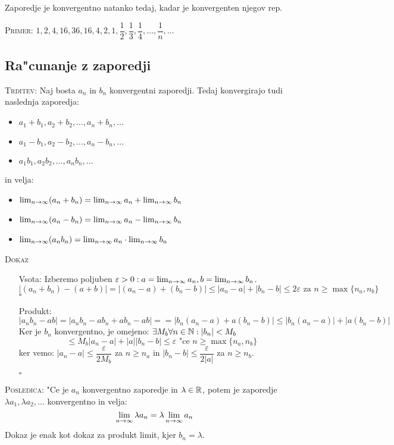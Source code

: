 Zaporedje je konvergentno natanko tedaj, kadar je konvergenten njegov rep.

\textsc{Primer:} $1, 2, 4, 16, 36, 16, 4, 2, 1, \dfrac{1}{2}, \dfrac{1}{3}, \dfrac{1}{4}, \ldots, \dfrac{1}{n}, \ldots$

\subsection{Ra"cunanje z zaporedji}
\textsc{Trditev:} Naj bosta $a_n$ in $b_n$ konvergentni zaporedji. Tedaj konvergirajo tudi naslednja zaporedja:
\begin{itemize}
	\item $a_1 + b_1, a_2 + b_2, \ldots, a_n + b_n, \ldots$
	\item $a_1 - b_1, a_2 - b_2, \ldots, a_n - b_n, \ldots$
	\item $a_1 b_1, a_2 b_2, \ldots, a_n b_n, \ldots$
\end{itemize}
in velja:
\begin{itemize}
	\item $\lim_{n \rightarrow \infty} (a_n + b_n) = \lim_{n \rightarrow \infty} a_n + \lim_{n \rightarrow \infty} b_n$
	\item $\lim_{n \rightarrow \infty} (a_n - b_n) = \lim_{n \rightarrow \infty} a_n - \lim_{n \rightarrow \infty} b_n$
	\item $\lim_{n \rightarrow \infty} (a_n b_n) = \lim_{n \rightarrow \infty} a_n \cdot \lim_{n \rightarrow \infty} b_n$
\end{itemize}
\textsc{Dokaz}
\begin{itemize}
	\item[Vsota:]
	Izberemo poljuben $\varepsilon > 0: a = \lim_{n \rightarrow \infty} a_n, b = \lim_{n \rightarrow \infty} b_n$.
	\begin{equation*}
	|(a_n + b_n) - (a + b)| = |(a_n - a) + (b_n - b)| \leq |a_n - a| + |b_n - b| \leq 2\varepsilon \text{ za $n \geq \max \{n_a, n_b\}$}
	\end{equation*}
	\hfill $\square$

	\item[Produkt:]
	\begin{equation*}
	|a_n b_n - ab| = |a_n b_n - ab_n + ab_n - ab| =  = |b_n(a_n - a) + a(b_n - b)| \leq |b_n(a_n - a)| + |a(b_n - b)|
	\end{equation*}
	Ker je $b_n$ konvergentno, je omejeno: $\exists M_b \forall n \in \mathbb{N}: |b_n| < M_b$
	\begin{equation*}
	\leq M_b|a_n - a| + |a||b_n - b| \leq \varepsilon \text{ "ce $n \geq \max \{n_a, n_b\}$}
	\end{equation*}
	ker vemo: $|a_n - a| \leq \dfrac{\varepsilon}{2M_b}$ za $n \geq n_a$ in $|b_n - b| \leq \dfrac{\varepsilon}{2|a|}$ za $n \geq n_b$.
	
	\hfill $\square$
\end{itemize}
\textsc{Posledica:} "Ce je $a_n$ konvergentno zaporedje in $\lambda \in \mathbb{R}$, potem je zaporedje $\lambda a_1, \lambda a_2, \ldots$ konvergentno in velja:
\begin{equation*}
\lim_{n \rightarrow \infty} \lambda a_n = \lambda \lim_{n \rightarrow \infty} a_n
\end{equation*}
Dokaz je enak kot dokaz za produkt limit, kjer $b_n = \lambda$.

